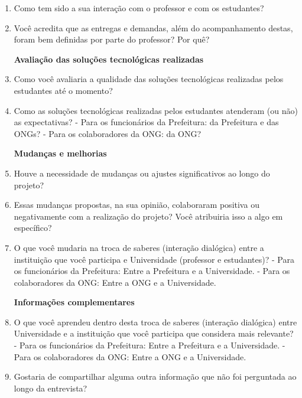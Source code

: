 \begin{enumerate}
    \item Como tem sido a sua interação com o professor e com os estudantes?
    \item Você acredita que as entregas e demandas, além do acompanhamento destas, foram bem definidas por parte do professor? Por quê?
\par\vspace{0.5\baselineskip}
\textbf{Avaliação das soluções tecnológicas realizadas}
    \item Como você avaliaria a qualidade das soluções tecnológicas realizadas pelos estudantes até o momento?
    \item Como as soluções tecnológicas realizadas pelos estudantes atenderam (ou não) as expectativas?
     - Para os funcionários da Prefeitura: da Prefeitura e das \gls{ONG}s?
    - Para os colaboradores da \gls{ONG}: da \gls{ONG}?
\par\vspace{0.5\baselineskip}
\textbf{Mudanças e melhorias}
    \item Houve a necessidade de mudanças ou ajustes significativos ao longo do projeto?
    \item Essas mudanças propostas, na sua opinião, colaboraram positiva ou negativamente com a realização do projeto? Você atribuiria isso a algo em específico?
    \item O que você mudaria na troca de saberes (interação dialógica) entre a instituição que você participa e Universidade (professor e estudantes)?
     - Para os funcionários da Prefeitura: Entre a Prefeitura e a Universidade.
    - Para os colaboradores da \gls{ONG}: Entre a \gls{ONG} e a Universidade.
\par\vspace{0.5\baselineskip}
\textbf{Informações complementares}
    \item O que você aprendeu dentro desta troca de saberes (interação dialógica) entre Universidade e a instituição que você participa que considera mais relevante?
     - Para os funcionários da Prefeitura: Entre a Prefeitura e a Universidade.
    - Para os colaboradores da \gls{ONG}: Entre a \gls{ONG} e a Universidade.
    \item Gostaria de compartilhar alguma outra informação que não foi perguntada ao longo da entrevista?
\end{enumerate}
